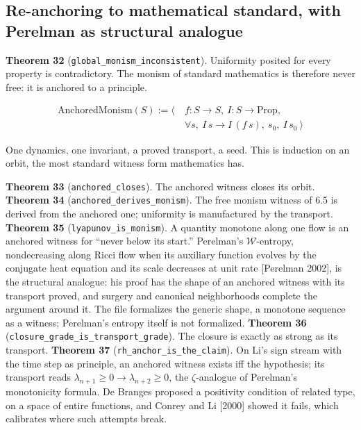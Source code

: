 \documentclass[10pt]{article}
\begin{document}
\hypertarget{re-anchoring-to-mathematical-standard-with-perelman-as-structural-analogue}{%
\subsection{Re-anchoring to mathematical standard, with Perelman as
structural
analogue}\label{re-anchoring-to-mathematical-standard-with-perelman-as-structural-analogue}}

\textbf{Theorem 32} (\texttt{global\_monism\_inconsistent}). Uniformity
posited for every property is contradictory. The monism of standard
mathematics is therefore never free: it is anchored to a principle.

\[\begin{aligned}\mathrm{AnchoredMonism}(S) := \big\langle\ &f : S \to S,\ I : S \to \mathrm{Prop},\\ &\forall s,\ I\,s \to I\,(f\,s),\ s_0,\ I\,s_0 \ \big\rangle\end{aligned}\]

One dynamics, one invariant, a proved transport, a seed. This is
induction on an orbit, the most standard witness form mathematics has.

\textbf{Theorem 33} (\texttt{anchored\_closes}). The anchored witness
closes its orbit. \textbf{Theorem 34}
(\texttt{anchored\_derives\_monism}). The free monism witness of 6.5 is
derived from the anchored one; uniformity is manufactured by the
transport. \textbf{Theorem 35} (\texttt{lyapunov\_is\_monism}). A
quantity monotone along one flow is an anchored witness for ``never
below its start.'' Perelman's \(\mathcal W\)-entropy, nondecreasing
along Ricci flow when its auxiliary function evolves by the conjugate
heat equation and its scale decreases at unit rate {[}Perelman 2002{]},
is the structural analogue: his proof has the shape of an anchored
witness with its transport proved, and surgery and canonical
neighborhoods complete the argument around it. The file formalizes the
generic shape, a monotone sequence as a witness; Perelman's entropy
itself is not formalized. \textbf{Theorem 36}
(\texttt{closure\_grade\_is\_transport\_grade}). The closure is exactly
as strong as its transport. \textbf{Theorem 37}
(\texttt{rh\_anchor\_is\_the\_claim}). On Li's sign stream with the time
step as principle, an anchored witness exists iff the hypothesis; its
transport reads \(\lambda_{n+1} \geq 0 \to \lambda_{n+2} \geq 0\), the
\(\zeta\)-analogue of Perelman's monotonicity formula. De Branges
proposed a positivity condition of related type, on a space of entire
functions, and Conrey and Li {[}2000{]} showed it fails, which
calibrates where such attempts break.
\end{document}
